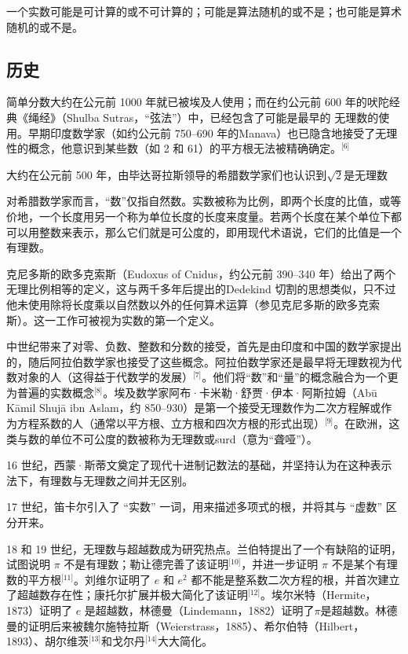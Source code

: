 一个实数可能是可计算的或不可计算的；可能是算法随机的或不是；也可能是算术随机的或不是。
\subsection{历史}
简单分数大约在公元前 1000 年就已被埃及人使用；而在约公元前 600 年的吠陀经典《绳经》（Shulba Sutras，“弦法”）中，已经包含了可能是最早的 无理数的使用。早期印度数学家（如约公元前 750–690 年的Manava）也已隐含地接受了无理性的概念，他意识到某些数（如 2 和 61）的平方根无法被精确确定。\(^\text{[6]}\)

大约在公元前 500 年，由毕达哥拉斯领导的希腊数学家们也认识到$\sqrt{2}$是无理数

对希腊数学家而言，“数”仅指自然数。实数被称为比例，即两个长度的比值，或等价地，一个长度用另一个称为单位长度的长度来度量。若两个长度在某个单位下都可以用整数来表示，那么它们就是可公度的，即用现代术语说，它们的比值是一个有理数。

克尼多斯的欧多克索斯（Eudoxus of Cnidus，约公元前 390–340 年）给出了两个无理比例相等的定义，这与两千多年后提出的Dedekind 切割的思想类似，只不过他未使用除将长度乘以自然数以外的任何算术运算（参见克尼多斯的欧多克索斯）。这一工作可被视为实数的第一个定义。

中世纪带来了对零、负数、整数和分数的接受，首先是由印度和中国的数学家提出的，随后阿拉伯数学家也接受了这些概念。阿拉伯数学家还是最早将无理数视为代数对象的人（这得益于代数学的发展）\(^\text{[7]}\)。他们将“数”和“量”的概念融合为一个更为普遍的实数概念\(^\text{[8]}\)。埃及数学家阿布·卡米勒·舒贾·伊本·阿斯拉姆（Abū Kāmil Shujā ibn Aslam，约 850–930）是第一个接受无理数作为二次方程解或作为方程系数的人（通常以平方根、立方根和四次方根的形式出现）\(^\text{[9]}\)。在欧洲，这类与数的单位不可公度的数被称为无理数或surd（意为“聋哑”）。

16 世纪，西蒙·斯蒂文奠定了现代十进制记数法的基础，并坚持认为在这种表示法下，有理数与无理数之间并无区别。

17 世纪，笛卡尔引入了 “实数” 一词，用来描述多项式的根，并将其与 “虚数” 区分开来。

18 和 19 世纪，无理数与超越数成为研究热点。兰伯特提出了一个有缺陷的证明，试图说明 $\pi$ 不是有理数；勒让德完善了该证明\(^\text{[10]}\)，并进一步证明 $\pi$ 不是某个有理数的平方根\(^\text{[11]}\)。刘维尔证明了 $e$ 和 $e^2$ 都不能是整系数二次方程的根，并首次建立了超越数存在性；康托尔扩展并极大简化了该证明\(^\text{[12]}\)。埃尔米特（Hermite，1873）证明了 $e$ 是超越数，林德曼（Lindemann，1882）证明了$\pi$是超越数。林德曼的证明后来被魏尔施特拉斯（Weierstrass，1885）、希尔伯特（Hilbert，1893）、胡尔维茨\(^\text{[13]}\)和戈尔丹\(^\text{[14]}\)大大简化。


